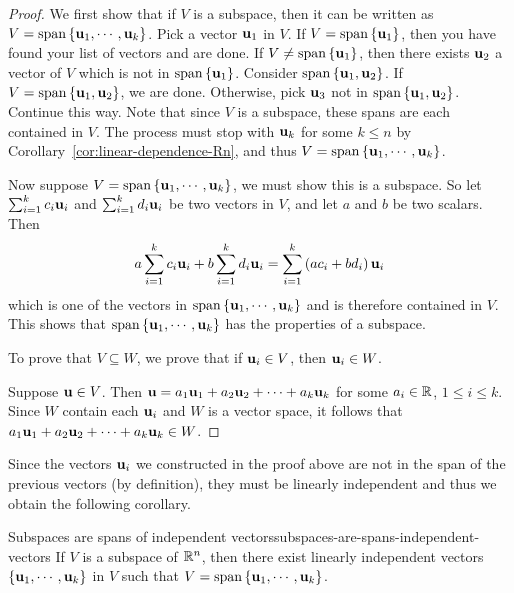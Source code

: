 \begin{proof}
  We first show that if $V$ is a subspace, then it can be written as
  $V= \sspan\set{\vect{u}_{1},\cdots ,\vect{u}_{k}}$. Pick a vector
  $\mbox{\bf u}_{1}$ in $V$. If $V= \sspan\set{\vect{u}_{1}}$, then you
  have found your list of vectors and are done. If
  $V\neq \sspan\set{\vect{u}_{1}}$, then there exists $\mbox{\bf u}_{2}$ a
  vector of $V$ which is not in $ \sspan\set{\vect{u}_{1}}$. Consider
  $\sspan\set{ \vect{u}_{1},\vect{u}_{2}}$.  If
  $V=\sspan\set{\vect{u}_{1},\vect{u}_{2}}$, we are done. Otherwise,
  pick $\mbox{\bf u}_{3}$ not in
  $\sspan\set{\vect{u}_{1},\vect{u}_{2}}$. Continue this way.  Note
  that since $V $ is a subspace, these spans are each contained in
  $V$.  The process must stop with $\mbox{\bf u}_{k}$ for some $k\leq n$
  by Corollary~\ref{cor:linear-dependence-Rn}, and thus
  $V=\sspan\set{\vect{u}_{1},\cdots , \vect{u}_{k}}$.

  Now suppose $V=\sspan\set{\vect{u}_{1},\cdots , \vect{u}_{k}}$, we
  must show this is a subspace. So let
  $\sum_{i=1}^{k}c_{i}\mbox{\bf u}_{i}$ and
  $ \sum_{i=1}^{k}d_{i}\mbox{\bf u}_{i}$ be two vectors in $V$, and let
  $a$ and $b$ be two scalars. Then
  \begin{equation*}
    a \sum_{i=1}^{k}c_{i}\mbox{\bf u}_{i}+ b \sum_{i=1}^{k}d_{i}\mbox{\bf u}_{i}=
    \sum_{i=1}^{k}\left(a c_{i}+b  d_{i}\right) \mbox{\bf u}_{i}
  \end{equation*}
  which is one of the vectors in
  $\sspan\set{\vect{u}_{1},\cdots , \vect{u}_{k}}$ and is therefore
  contained in $V$. This shows that
  $\sspan\set{\vect{u}_{1},\cdots ,\vect{u}_{k}} $ has the properties
  of a subspace.

  To prove that $V \subseteq W$, we prove that if $\mbox{\bf u}_i\in V$,
  then $\mbox{\bf u}_i \in W$.

  Suppose $\mbox{\bf u}\in V$.  Then
  $\mbox{\bf u}=a_1\mbox{\bf u}_1 + a_2\mbox{\bf u}_2 + \cdots + a_k\mbox{\bf u}_k$
  for some $a_i\in\mathbb{R}$, $1\leq i\leq k$.  Since $W$ contain each
  $\mbox{\bf u}_i$ and $W$ is a vector space, it follows that
  $ a_1\mbox{\bf u}_1 + a_2\mbox{\bf u}_2 + \cdots + a_k\mbox{\bf u}_k \in W$.
\end{proof}

Since the vectors $\mbox{\bf u}_i$ we constructed in the proof above are
not in the span of the previous vectors (by definition), they must be
linearly independent and thus we obtain the following corollary.

\begin{corollary}{Subspaces are spans of independent vectors}{subspaces-are-spans-independent-vectors}
  If $V$ is a subspace of $\mathbb{R}^{n}$, then there exist linearly
  independent vectors $\left\{\mbox{\bf u}_{1},\cdots ,\mbox{\bf u}_{k}\right\}$ in $V$
  such that $V=\sspan\set{\vect{u}_{1},\cdots ,\vect{u}_{k}}$.
\end{corollary}

